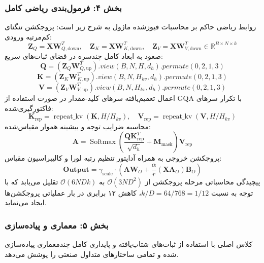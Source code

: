 \subsubsection*{بخش ۴: فرمول‌بندی ریاضی کامل }
روابط ریاضی حاکم بر محاسبات فیوزشده ماژول به شرح زیر است:
پروجکشن تنگنای کم‌مرتبه ورودی:
\begin{equation}
\mathbf{Z}_Q = \mathbf{X} \mathbf{W}_{Q, \text{down}}^T, \quad \mathbf{Z}_K = \mathbf{X} \mathbf{W}_{K, \text{down}}^T, \quad \mathbf{Z}_V = \mathbf{X} \mathbf{W}_{V, \text{down}}^T \in \mathbb{R}^{B \times N \times k}
\end{equation}
صعود به ابعاد کامل چندسره در فضای ثبات‌های سریع:
\begin{equation}
\mathbf{Q} = (\mathbf{Z}_Q \mathbf{W}_{Q, \text{up}}^T).view(B, N, H, d_h).permute(0, 2, 1, 3)
\end{equation}
\begin{equation}
\mathbf{K} = (\mathbf{Z}_K \mathbf{W}_{K, \text{up}}^T).view(B, N, H_{kv}, d_h).permute(0, 2, 1, 3)
\end{equation}
\begin{equation}
\mathbf{V} = (\mathbf{Z}_V \mathbf{W}_{V, \text{up}}^T).view(B, N, H_{kv}, d_h).permute(0, 2, 1, 3)
\end{equation}
اعمال تعمیم‌یافته سرهای کلید-مقدار در صورت استفاده از GQA با تکرار سرهای فاکتورگیری‌شده:
\begin{equation}
\mathbf{K}_{\text{rep}} = \operatorname{repeat\_kv}(\mathbf{K}, H / H_{kv}), \quad \mathbf{V}_{\text{rep}} = \operatorname{repeat\_kv}(\mathbf{V}, H / H_{kv})
\end{equation}
محاسبه ضرایب توجه و بیشینه هموار مقیاس‌شده:
\begin{equation}
\mathbf{A} = \operatorname{Softmax}\left(\frac{\mathbf{Q} \mathbf{K}_{\text{rep}}^T}{\sqrt{d_h}} + \mathbf{M}_{\text{mask}}\right) \mathbf{V}_{\text{rep}}
\end{equation}
پروجکشن خروجی به همراه آداپتور تنظیم رتبه لورا و کالیبراسیون مقیاس:
\begin{equation}
\mathbf{Output} = \gamma_{\text{scale}} \cdot \left( \mathbf{A} \mathbf{W}_O + \frac{\alpha}{r} (\mathbf{X} \mathbf{A}_O) \mathbf{B}_O \right)
\end{equation}
پیچیدگی محاسباتی مرحله پروجکشن از $\mathcal{O}(3 N D^2)$ به $\mathcal{O}(6 N D k)$ تقلیل می‌یابد که با توجه به نسبت $k/D = 64/768 = 1/12$، کاهش ۱۲ برابری در بار عملیاتی پروجکشن‌ها ایجاد می‌نماید.

\subsubsection*{بخش ۵: معماری و پیاده‌سازی }
کلاس اصلی  با استفاده از ثبات‌های شتاب‌یافته و پایداری کامل چندمعماری پیاده‌سازی شده و تمامی ساختارهای متداول صنعتی را پوشش می‌دهد.


